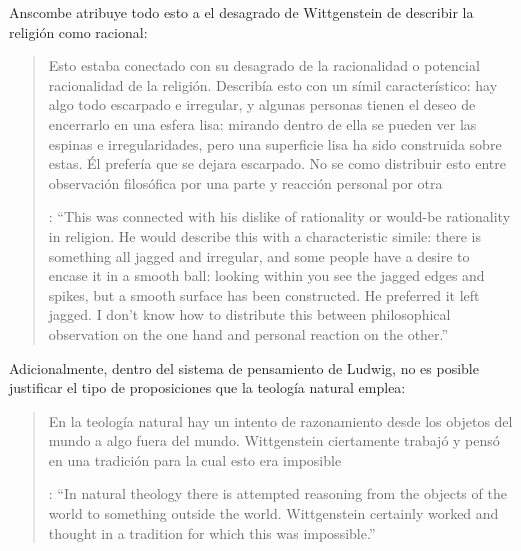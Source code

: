 Anscombe atribuye todo esto a el desagrado de Wittgenstein de describir la religión como racional: \blockquote[{\cite[122]{anscombe1981parmenides:qli}}: \enquote{This was connected with his dislike of rationality or would-be rationality in religion. He would describe this with a characteristic simile: there is something all jagged and irregular, and some people have a desire to encase it in a smooth ball: looking within you see the jagged edges and spikes, but a smooth surface has been constructed. He preferred it left jagged. I don't know how to distribute this between philosophical observation on the one hand and personal reaction on the other.}]{Esto estaba conectado con su desagrado de la racionalidad o potencial racionalidad de la religión. Describía esto con un símil característico: hay algo todo escarpado e irregular, y algunas personas tienen el deseo de encerrarlo en una esfera lisa: mirando dentro de ella se pueden ver las espinas e irregularidades, pero una superficie lisa ha sido construida sobre estas. Él prefería que se dejara escarpado. No se como distribuir esto entre observación filosófica por una parte y reacción personal por otra}. Adicionalmente, dentro del sistema de pensamiento de Ludwig, no es posible justificar el tipo de proposiciones que la teología natural emplea: \blockquote[{\cite[123]{anscombe1981parmenides:qli}}: \enquote{In natural theology there is attempted reasoning from the objects of the world to something outside the world. Wittgenstein certainly worked and thought in a tradition for which this was impossible.}]{En la teología natural hay un intento de razonamiento desde los objetos del mundo a algo fuera del mundo. Wittgenstein ciertamente trabajó y pensó en una tradición para la cual esto era imposible}.

